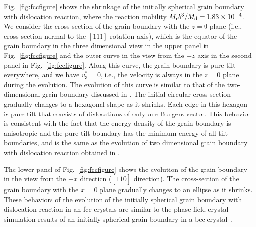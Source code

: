 Fig.~\ref{fig:fccfigure} shows the shrinkage of the initially spherical grain boundary with dislocation reaction, where the reaction mobility  $M_{\rm r}b^3/M_{\rm d}=1.83\times10^{-4}$.
We consider the cross-section of the grain boundary with the $z=0$ plane (i.e., cross-section normal to the $[111]$ rotation axis), which is the equator of the grain boundary in the three dimensional view in the upper panel in Fig.~\ref{fig:fccfigure} and the outer curve in the view from the $+z$ axis in
 the second panel in Fig.~\ref{fig:fccfigure}.
Along this curve, the grain boundary is pure tilt everywhere, and we have $ v^*_3=0$, i.e., the velocity is always in the $z=0$ plane during the evolution.  The evolution of this curve is similar to that of the two-dimensional grain boundary discussed in \cite{zhang2018motion,zhang2019new}.  The initial circular cross-section gradually changes to a hexagonal shape as it shrinks. Each edge in this hexagon is pure tilt that consists of dislocations of only one Burgers vector. This behavior is consistent with the fact that the energy density of the grain boundary is anisotropic and the pure tilt boundary has the minimum energy of all tilt boundaries, and is the same as the evolution of two dimensional grain boundary with dislocation reaction obtained in \cite{zhang2018motion,zhang2019new}.

The lower panel of Fig.~\ref{fig:fccfigure} shows the evolution of the grain boundary in the view from the $+x$ direction ($[\bar{1}10]$ direction). The cross-section of the grain boundary with the $x=0$ plane gradually changes to an ellipse as it shrinks.
These behaviors of the evolution of the initially spherical grain boundary with dislocation reaction in an fcc crystals are similar to the phase field crystal simulation results of an initially spherical  grain boundary in a bcc crystal~\cite{yamanaka2017phase}.


